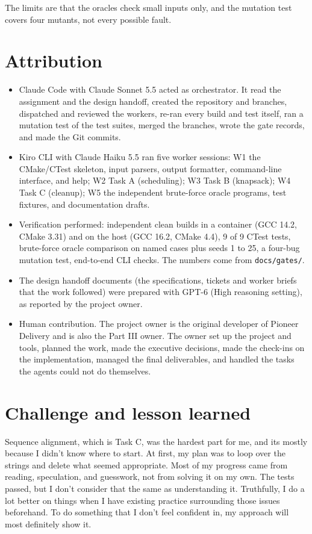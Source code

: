 \documentclass[11pt]{article}
\begin{document}
The limits are that the oracles check small inputs only, and the mutation test covers four
mutants, not every possible fault.

\section{Attribution}

\begin{itemize}
\item Claude Code with Claude Sonnet 5.5 acted as orchestrator. It read the assignment and the
  design handoff, created the repository and branches, dispatched and reviewed the workers,
  re-ran every build and test itself, ran a mutation test of the test suites, merged the branches,
  wrote the gate records, and made the Git commits.
\item Kiro CLI with Claude Haiku 5.5 ran five worker sessions: W1 the CMake/CTest skeleton, input
  parsers, output formatter, command-line interface, and help; W2 Task A (scheduling); W3 Task B
  (knapsack); W4 Task C (cleanup); W5 the independent brute-force oracle programs, test fixtures,
  and documentation drafts.
\item Verification performed: independent clean builds in a container (GCC 14.2, CMake 3.31) and on
  the host (GCC 16.2, CMake 4.4), 9 of 9 CTest tests, brute-force oracle comparison on named cases
  plus seeds 1 to 25, a four-bug mutation test, end-to-end CLI checks. The numbers come from
  \texttt{docs/gates/}.
\item The design handoff documents (the specifications, tickets and worker briefs that the work
  followed) were prepared with GPT-6 (High reasoning setting), as reported by the project owner.
\item Human contribution. The project owner is the original developer of Pioneer Delivery and
  is also the Part III owner. The owner set up the project and tools, planned the work, made the
  executive decisions, made the check-ins on the implementation, managed the final deliverables, and
  handled the tasks the agents could not do themselves.
\end{itemize}

\section{Challenge and lesson learned}

Sequence alignment, which is Task C, was the hardest part for me, and its mostly because I didn't know where to start. At first, my plan was to loop over the strings and delete what seemed appropriate. Most of my progress came from reading, speculation, and guesswork, not from solving it on my own. The tests passed, but I don't consider that the same as understanding it. Truthfully, I do a lot better on things when I have existing practice surrounding those issues beforehand. To do something that I don't feel confident in, my approach will most definitely show it.
\end{document}
